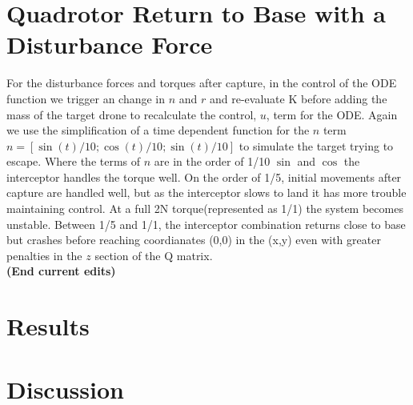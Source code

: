 \documentclass{article}
\begin{document}
\begin{multicols}{2}
\section*{Quadrotor Return to Base with a Disturbance Force}
For the disturbance forces and torques after capture,  in the control of the ODE function we trigger an change in $n$ and $r$ and re-evaluate K before adding the mass of the target drone to recalculate the control, $u$, term for the ODE.  Again we use the simplification of a time dependent function for the $n$ term $n=[\sin(t)/10; \cos(t)/10; \sin(t)/10]$ to simulate the target trying to escape.  Where the terms of $n$ are in the order of 1/10 $\sin$ and $\cos$ the interceptor handles the torque well.  On the order of 1/5, initial movements after capture are handled well, but as the interceptor slows to land it has more trouble maintaining control.  At a full 2N torque(represented as 1/1) the system becomes unstable. Between 1/5 and 1/1, the interceptor combination returns close to base but crashes before reaching coordianates (0,0) in the (x,y) even with greater penalties in the $z$ section of the Q matrix.\\
  
\textbf{(End current edits)}
\section*{Results}
\section*{Discussion}


\end{multicols}
\end{document}
